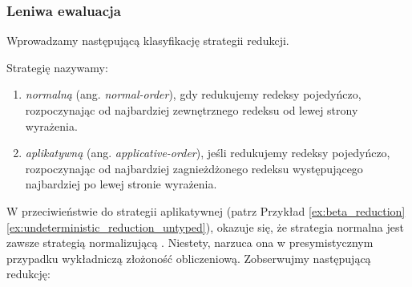 \subsubsection{Leniwa ewaluacja}\label{subsec:lazy_eval}
Wprowadzamy następującą klasyfikację strategii redukcji.

\begin{definicja}
Strategię nazywamy:
\begin{enumerate}
\item \emph{normalną} (ang. \emph{normal-order}), gdy redukujemy redeksy pojedyńczo, rozpoczynając od najbardziej zewnętrznego redeksu od lewej strony wyrażenia.
\item \emph{aplikatywną} (ang. \emph{applicative-order}), jeśli redukujemy redeksy pojedyńczo, rozpoczynając od najbardziej zagnieżdżonego redeksu występującego najbardziej po lewej stronie wyrażenia.
\end{enumerate}
\end{definicja}

W przeciwieństwie do strategii aplikatywnej (patrz Przykład \ref{ex:beta_reduction}\ref{ex:undeterministic_reduction_untyped}), okazuje się, że strategia normalna jest zawsze strategią normalizującą \cite[Rozdział 1.5]{Urzyczyn2006}. Niestety, narzuca ona w presymistycznym przypadku wykładniczą złożoność obliczeniową. Zobserwujmy następującą redukcję:

